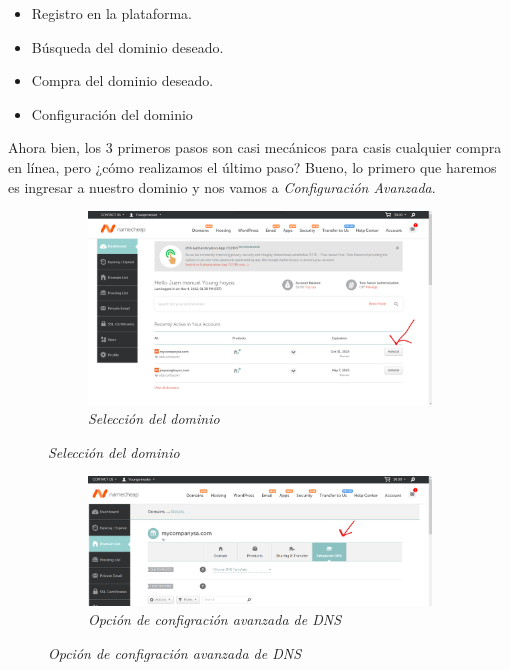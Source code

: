 \begin{itemize}
    \item Registro en la plataforma.
    \item Búsqueda del dominio deseado.
    \item Compra del dominio deseado.
    \item Configuración del dominio 
\end{itemize}

Ahora bien, los 3 primeros pasos son casi mecánicos para casis cualquier compra
en línea, pero ¿cómo realizamos el último paso? Bueno, lo primero que haremos es
ingresar a nuestro dominio y nos vamos a \textit{Configuración Avanzada}.

\begin{figure}[H]
    \centering
    \begin{subfigure}[b]{0.8\textwidth}
        \centering
        \includegraphics[width=\textwidth]{Figures/0. General/domain_selection.png}
        \caption{\textit{Selección del dominio}}
        \label{fig: domain selection}
    \end{subfigure}
\end{figure}

\begin{figure}[H]
    \centering
    \begin{subfigure}[b]{0.8\textwidth}
        \centering
        \includegraphics[width=\textwidth]{Figures/0. General/advanced_config_selection.png}
        \caption{\textit{Opción de configración avanzada de DNS}}
        \label{fig: advanced dns configuration}
    \end{subfigure}
\end{figure}

